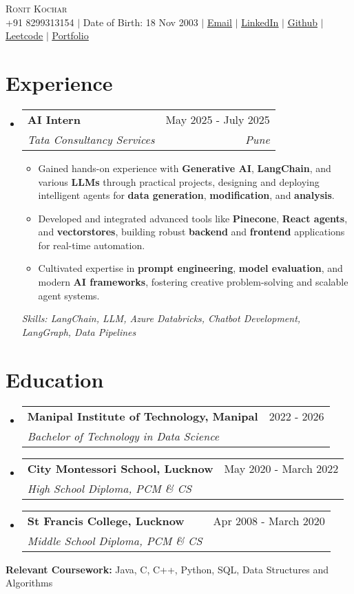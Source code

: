 \documentclass[letterpaper,10pt]{article}
\makeatletter
\newcommand{\resumeItem}[1]{
  \item\footnotesize{
    {#1 \vspace{-1pt}}
  }
}
\newcommand{\resumeSubheading}[4]{
  \vspace{-1pt}\item
    \begin{tabular*}{0.97\textwidth}[t]{l@{\extracolsep{\fill}}r}
      \textbf{#1} & #2 \\
      \textit{\footnotesize#3} & \textit{\footnotesize #4} \\
    \end{tabular*}\vspace{-5pt}
}
\newcommand{\resumeSubHeadingListStart}{\begin{itemize}[leftmargin=0.15in, label={}]}
\newcommand{\resumeSubHeadingListEnd}{\end{itemize}}
\newcommand{\resumeItemListStart}{\begin{itemize}}
\newcommand{\resumeItemListEnd}{\end{itemize}\vspace{-3pt}}
\makeatother
\begin{document}
\begin{center}
    {\Huge \scshape Ronit Kochar} \\[1pt]
    \small +91 8299313154 $|$ Date of Birth: 18 Nov 2003 $|$ \href{mailto:ronitkochar2001@gmail.com}{\underline{Email}} $|$
    \href{https://www.linkedin.com/in/ronit-kochar-0a70841b7/}{\underline{LinkedIn}} $|$
    \href{https://github.com/RonitKochar}{\underline{Github}} $|$
    \href{https://leetcode.com/u/RonitKochar/}{\underline{Leetcode}} $|$
    \href{https://ronitkochar.github.io/Portfolio/}{\underline{Portfolio}}
\end{center}

\section{Experience}
  \resumeSubHeadingListStart
      \resumeSubheading
      {AI Intern}{May 2025 - July 2025}
      {Tata Consultancy Services}{Pune}
      \resumeItemListStart
        \resumeItem{Gained hands-on experience with \textbf{Generative AI}, \textbf{LangChain}, and various \textbf{LLMs} through practical projects, designing and deploying intelligent agents for \textbf{data generation}, \textbf{modification}, and \textbf{analysis}.}
        \resumeItem{Developed and integrated advanced tools like \textbf{Pinecone}, \textbf{React agents}, and \textbf{vectorstores}, building robust \textbf{backend} and \textbf{frontend} applications for real-time automation.}
        \resumeItem{Cultivated expertise in \textbf{prompt engineering}, \textbf{model evaluation}, and modern \textbf{AI frameworks}, fostering creative problem-solving and scalable agent systems.}
      \resumeItemListEnd

      {\small\textit{Skills: LangChain, LLM, Azure Databricks, Chatbot Development, LangGraph, Data Pipelines}}
  \resumeSubHeadingListEnd

\section{Education}
  \resumeSubHeadingListStart
    \resumeSubheading
      {Manipal Institute of Technology, Manipal}{2022 - 2026}
      {Bachelor of Technology in Data Science}{}
    \resumeSubheading
      {City Montessori School, Lucknow}{May 2020 - March 2022}
      {High School Diploma, PCM \& CS}{}
    \resumeSubheading
      {St Francis College, Lucknow}{Apr 2008 - March 2020}
      {Middle School Diploma, PCM \& CS}{}
  \resumeSubHeadingListEnd
  \vspace*{0.1cm}
  \textbf{Relevant Coursework:} Java, C, C++, Python, SQL, Data Structures and Algorithms
\end{document}
